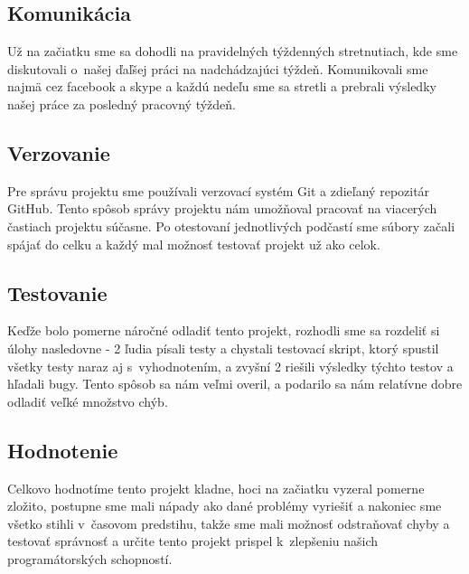 \documentclass [11pt, a4paper]{article}
\begin{document}
\subsection{Komunikácia}
Už na začiatku sme sa dohodli na pravidelných týždenných stretnutiach, kde sme diskutovali o~našej ďaľšej práci na nadchádzajúci týždeň. Komunikovali sme najmä cez facebook a skype a každú nedeľu sme sa stretli a prebrali výsledky našej práce za posledný pracovný týždeň. 

\subsection{Verzovanie}
Pre správu projektu sme používali verzovací systém Git a zdieľaný repozitár GitHub. Tento spôsob správy projektu nám umožňoval pracovať na viacerých častiach projektu súčasne. Po otestovaní jednotlivých podčastí sme súbory začali spájať do celku a každý mal možnosť testovať projekt už ako celok.

\subsection{Testovanie}
Keďže bolo pomerne náročné odladiť tento projekt, rozhodli sme sa rozdeliť si úlohy nasledovne - 2 ľudia písali testy a chystali testovací skript, ktorý spustil všetky testy naraz aj s~vyhodnotením, a zvyšní 2 riešili výsledky týchto testov a hľadali bugy. Tento spôsob sa nám veľmi overil, a podarilo sa nám relatívne dobre odladiť veľké množstvo chýb.

\subsection{Hodnotenie}
Celkovo hodnotíme tento projekt kladne, hoci na začiatku vyzeral pomerne zložito, postupne sme mali nápady ako dané problémy vyriešiť a nakoniec sme všetko stihli v~časovom predstihu, takže sme mali možnosť odstraňovať chyby a testovať správnosť a určite tento projekt prispel k~zlepšeniu našich programátorských schopností.
\newpage

\renewcommand{\refname}{Použitá literatúra}


\newpage
\appendix
\end{document}
